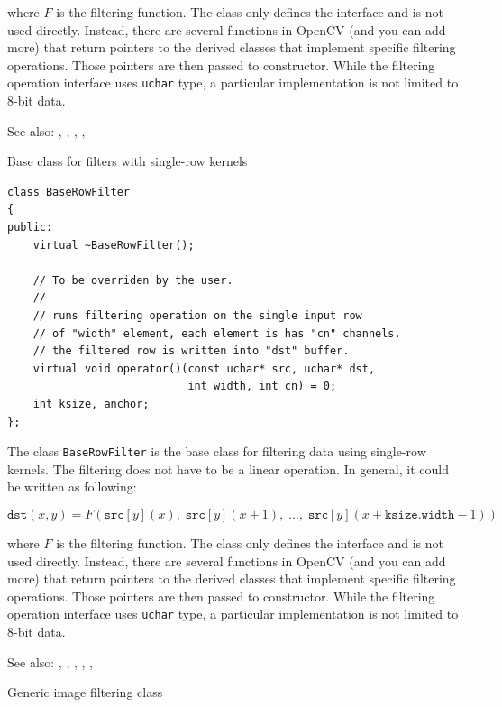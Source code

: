 where $F$ is the filtering function. The class only defines the interface and is not used directly. Instead, there are several functions in OpenCV (and you can add more) that return pointers to the derived classes that implement specific filtering operations. Those pointers are then passed to  constructor. While the filtering operation interface uses \texttt{uchar} type, a particular implementation is not limited to 8-bit data.

See also: , , ,
    , 

\label{BaseRowFilter}
Base class for filters with single-row kernels

\begin{lstlisting}
class BaseRowFilter
{
public:
    virtual ~BaseRowFilter();
    
    // To be overriden by the user.
    //
    // runs filtering operation on the single input row
    // of "width" element, each element is has "cn" channels.
    // the filtered row is written into "dst" buffer.
    virtual void operator()(const uchar* src, uchar* dst,
                            int width, int cn) = 0;
    int ksize, anchor;
};
\end{lstlisting}

The class \texttt{BaseRowFilter} is the base class for filtering data using single-row kernels. The filtering does not have to be a linear operation. In general, it could be written as following:

\[\texttt{dst}(x,y) = F(\texttt{src}[y](x),\;\texttt{src}[y](x+1),\;...,\;\texttt{src}[y](x+\texttt{ksize.width}-1))\]

where $F$ is the filtering function. The class only defines the interface and is not used directly. Instead, there are several functions in OpenCV (and you can add more) that return pointers to the derived classes that implement specific filtering operations. Those pointers are then passed to  constructor. While the filtering operation interface uses \texttt{uchar} type, a particular implementation is not limited to 8-bit data.

See also: , , ,
 , , 

\label{FilterEngine}
Generic image filtering class

